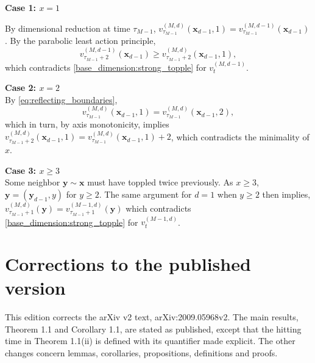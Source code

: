 \documentclass[12pt]{amsart}
\begin{document}
{\bf Case 1: $x = 1$}

By dimensional reduction at time $\tau_{M-1}$, $v_{\tau_{M-1}}^{(M,d)}(\mathbf{x}_{d-1},1) = v_{\tau_{M-1}}^{(M,d-1)}(\mathbf{x}_{d-1})$.
By the parabolic least action principle, 
\[
v_{\tau_{M-1}+2}^{(M,d-1)}(\mathbf{x}_{d-1}) \geq v_{\tau_{M-1}+2}^{(M,d)}(\mathbf{x}_{d-1},1),
\]
which contradicts \eqref{base_dimension:strong_topple} for $v_{t}^{(M,d-1)}$. 


{\bf Case 2: $x = 2$} \\
By \eqref{eq:reflecting_boundaries}, 
\[
v_{\tau_{M-1}}^{(M,d)}(\mathbf{x}_{d-1},1) = v_{\tau_{M-1}}^{(M,d)}(\mathbf{x}_{d-1},2),
\]
which in turn, by axis monotonicity, implies
$v_{\tau_{M-1}+2}^{(M,d)}(\mathbf{x}_{d-1},1) = v_{\tau_{M-1}}^{(M,d)}(\mathbf{x}_{d-1},1)+2$,
which contradicts the minimality of $x$.



{\bf Case 3: $x \geq 3$}  \\
Some neighbor $\mathbf{y} \sim \mathbf{x}$ must have toppled twice previously. As $x \geq 3$, $\mathbf{y} = (\mathbf{y}_{d-1}, y)$ for $y \geq 2$. The same argument for $d=1$ when $y \geq 2$ then implies, $v_{\tau_{M-1}+1}^{(M,d)}(\mathbf{y}) =  v_{\tau_{M-1}+1}^{(M-1,d)}(\mathbf{y})$ which contradicts \eqref{base_dimension:strong_topple} for $v_{t}^{(M-1,d)}$.  



\section*{Corrections to the published version}

This edition corrects the arXiv v2 text, arXiv:2009.05968v2. The main results, Theorem 1.1 and Corollary 1.1, are stated as published, except that the hitting time in Theorem 1.1(ii) is defined with its quantifier made explicit. The other changes concern lemmas, corollaries, propositions, definitions and proofs.
\end{document}
